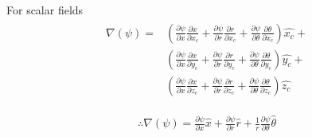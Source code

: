 \documentclass{kthreport}
\begin{document}
For scalar fields
\begin{eqnarray}
	\begin{split}
	\nabla(\psi) 	= & \left(\frac{\partial\psi}{\partial x}\frac{\partial x}{\partial x_{c}} + \frac{\partial\psi}{\partial r}\frac{\partial r}{\partial x_{c}} + \frac{\partial\psi}{\partial \theta}\frac{\partial \theta}{\partial x_{c}}\right)\hat{x_{c}} + \\
	& \left(\frac{\partial\psi}{\partial x}\frac{\partial x}{\partial y_{c}} + \frac{\partial\psi}{\partial r}\frac{\partial r}{\partial y_{c}} + \frac{\partial\psi}{\partial \theta}\frac{\partial \theta}{\partial y_{c}}\right)\hat{y_{c}} + \\
	& \left(\frac{\partial\psi}{\partial x}\frac{\partial x}{\partial z_{c}} + \frac{\partial\psi}{\partial r}\frac{\partial r}{\partial z_{c}} + \frac{\partial\psi}{\partial \theta}\frac{\partial \theta}{\partial z_{c}} \right)\hat{z_{c}}
	\end{split} \nonumber
\end{eqnarray}

\begin{eqnarray}
	\therefore \nabla(\psi) 	= \frac{\partial\psi}{\partial x}\hat{x} + \frac{\partial\psi}{\partial r}\hat{r} + \frac{1}{r}\frac{\partial\psi}{\partial \theta}\hat{\theta}
	\label{eqn:scalar_gradient}
\end{eqnarray}
\end{document}
